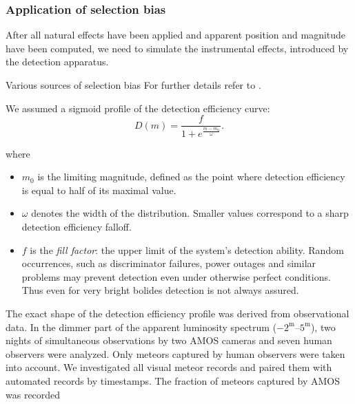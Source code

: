         \subsubsection{Application of selection bias}
            After all natural effects have been applied and apparent position and magnitude have been computed,
            we need to simulate the instrumental effects, introduced by the detection apparatus.
            
            Various sources of selection bias 
            For further details refer to \cite{balaz-inprep}.
            
            We assumed a sigmoid profile of the detection efficiency curve:
            \begin{equation}
                D(m) = \frac{f}{1 + e^{\frac{m - m_0}{\omega}}}\text{.}
                \label{eq:sls}
            \end{equation}
            
            where
            \begin{itemize}
                \item $m_0$ is the limiting magnitude, defined as the point where
                    detection efficiency is equal to half of its maximal value.
                \item $\omega$ denotes the width of the distribution.
                    Smaller values correspond to a sharp detection efficiency falloff.
                \item $f$ is the \emph{fill factor}: the upper limit of the system's detection ability.
                    Random occurrences, such as discriminator failures, power outages and similar problems
                    may prevent detection even under otherwise perfect conditions. Thus even for very
                    bright bolides detection is not always assured.
            \end{itemize}

            The exact shape of the detection efficiency profile was derived from observational data.
            In the dimmer part of the apparent luminosity spectrum ($-2^\mathrm{m}$--$5^\mathrm{m}$),
            two nights of simultaneous observations by two AMOS cameras and seven human observers were analyzed.
            Only meteors captured by human observers were taken into account. We investigated all visual meteor records
            and paired them with automated records by timestamps. The fraction of meteors captured by AMOS
            was recorded 
            
